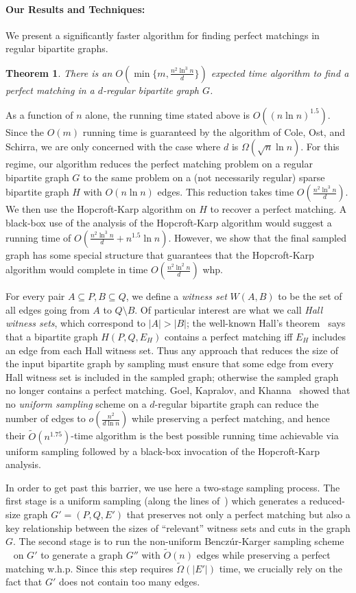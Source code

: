 \documentclass[11pt]{article}
\newtheorem{theorem}{Theorem}[section]
\begin{document}
\paragraph{Our Results and Techniques:}
We present a significantly faster algorithm for finding perfect matchings in
regular bipartite graphs.
\begin{theorem}
There is an $O\left(\min\{m, \frac{n^2\ln^3 n}{d}\}\right)$ expected time
algorithm to find a perfect matching in a $d$-regular bipartite graph $G$.
\end{theorem}
As a function of $n$ alone, the running time stated above is $O((n\ln
n)^{1.5})$. Since the $O(m)$ running time is guaranteed by the algorithm of
Cole, Ost, and Schirra, we are only concerned with the case where $d$ is
$\Omega(\sqrt{n} \ln n)$. For this regime, our algorithm reduces the perfect
matching problem on a regular bipartite graph $G$ to the same problem on a
(not necessarily regular) sparse bipartite graph $H$ with $O(n\ln n)$
edges. This reduction takes time $O(\frac{n^2\ln^3 n}{d})$. We then use the
Hopcroft-Karp algorithm on $H$ to recover a perfect matching. A black-box use
of the analysis of the Hopcroft-Karp algorithm would suggest a running time of
$O(\frac{n^2\ln^3 n}{d} + n^{1.5}\ln n)$. However, we show that the final
sampled graph has some special structure that guarantees that the
Hopcroft-Karp algorithm would complete in time $O(\frac{n^2\ln^2 n}{d})$ whp.

For every pair $A\subseteq P, B\subseteq Q$, we define a {\em witness set}
$W(A,B)$ to be the set of all edges going from $A$ to $Q\setminus B$. Of
particular interest are what we call {\em Hall witness sets}, which correspond
to $|A| > |B|$; the well-known Hall's theorem~\cite{b:graphtheory} says that a
bipartite graph $H(P,Q,E_H)$ contains a perfect matching iff $E_H$ includes an
edge from each Hall witness set.
Thus any approach that reduces the size of the input bipartite graph by
sampling must ensure that some edge from every Hall witness set is included in
the sampled graph; otherwise the sampled graph no longer contains a perfect
matching.  Goel, Kapralov, and Khanna~\cite{gkk:rbp08} showed that no {\em
  uniform sampling} scheme on a $d$-regular bipartite graph can reduce the
number of edges to $o(\frac{n^2}{d \ln n})$ while preserving a perfect
matching, and hence their $\tilde{O}(n^{1.75})$-time algorithm is the best
possible running time achievable via uniform sampling followed by a black-box
invocation of the Hopcroft-Karp analysis.

In order to get past this barrier, we use here a two-stage sampling
process. The first stage is a uniform sampling (along the lines
of~\cite{gkk:rbp08}) which generates a reduced-size graph $G'=(P,Q,E')$ that
preserves not only a perfect matching but also a key relationship between the
sizes of ``relevant'' witness sets and cuts in the graph $G$. The second stage
is to run the non-uniform Bencz\'{u}r-Karger sampling scheme
~\cite{benczurkarger96} on $G'$ to generate a graph $G''$ with $\tilde{O}(n)$
edges while preserving a perfect matching w.h.p. Since this step requires
$\tilde\Omega(|E'|)$ time, we crucially rely on the fact that $G'$ does not
contain too many edges.
\end{document}
